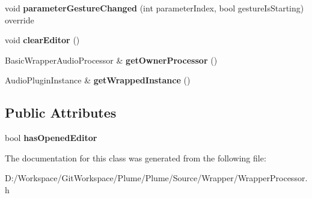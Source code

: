 \begin{DoxyCompactItemize}
\item 
\mbox{\label{class_wrapped_processor_abc34c75cfbe64fc93ae8b5d9c7d06a88}} 
void {\bfseries parameter\+Gesture\+Changed} (int parameter\+Index, bool gesture\+Is\+Starting) override
\item 
\mbox{\label{class_wrapped_processor_a415eda87f6181310052dea859e97f67d}} 
void {\bfseries clear\+Editor} ()
\item 
\mbox{\label{class_wrapped_processor_acca9a7946bd802f6238e61c80f07cbfe}} 
Basic\+Wrapper\+Audio\+Processor \& {\bfseries get\+Owner\+Processor} ()
\item 
\mbox{\label{class_wrapped_processor_a84c7f82c147f66e83d30691ab6fc7648}} 
Audio\+Plugin\+Instance \& {\bfseries get\+Wrapped\+Instance} ()
\end{DoxyCompactItemize}
\subsection*{Public Attributes}
\begin{DoxyCompactItemize}
\item 
\mbox{\label{class_wrapped_processor_a646ab07ba0dc0d9f9a299f8845c5ade3}} 
bool {\bfseries has\+Opened\+Editor}
\end{DoxyCompactItemize}


The documentation for this class was generated from the following file\+:\begin{DoxyCompactItemize}
\item 
D\+:/\+Workspace/\+Git\+Workspace/\+Plume/\+Plume/\+Source/\+Wrapper/Wrapper\+Processor.\+h\end{DoxyCompactItemize}
